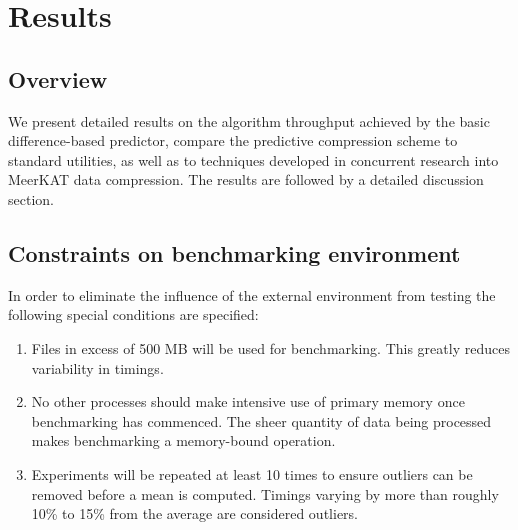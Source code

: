 \section{Results}
\subsection{Overview}
We present detailed results on the algorithm throughput achieved by the basic difference-based predictor, compare the predictive compression scheme to standard utilities, 
as well as to techniques developed in concurrent research into MeerKAT data compression. The results are followed by a detailed discussion section.
\subsection{Constraints on benchmarking environment}
In order to eliminate the influence of the external environment from testing the following special conditions are specified:
\begin{enumerate}
 \item Files in excess of 500 MB will be used for benchmarking. This greatly reduces variability in timings.
 \item No other processes should make intensive use of primary memory once benchmarking has commenced. The sheer quantity of data being processed makes 
 benchmarking a memory-bound operation.
 \item Experiments will be repeated at least 10 times to ensure outliers can be removed before a mean is computed. Timings varying by more than roughly 10\% to 15\% from the 
 average are considered outliers.
\end{enumerate}

